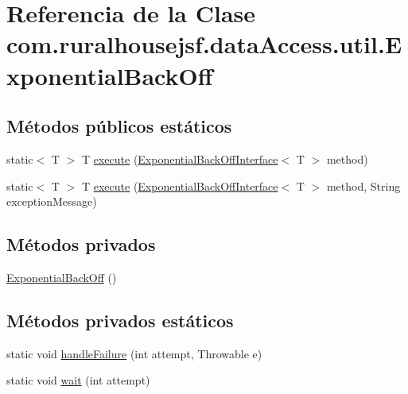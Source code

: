 \hypertarget{classcom_1_1ruralhousejsf_1_1data_access_1_1util_1_1_exponential_back_off}{}\section{Referencia de la Clase com.\+ruralhousejsf.\+data\+Access.\+util.\+Exponential\+Back\+Off}
\label{classcom_1_1ruralhousejsf_1_1data_access_1_1util_1_1_exponential_back_off}
\subsection*{Métodos públicos estáticos}
\begin{DoxyCompactItemize}
\item 
static$<$ T $>$ T \mbox{\hyperlink{classcom_1_1ruralhousejsf_1_1data_access_1_1util_1_1_exponential_back_off_a7c14ce7a46732baa58e3b0bf06455a9b}{execute}} (\mbox{\hyperlink{interfacecom_1_1ruralhousejsf_1_1data_access_1_1util_1_1_exponential_back_off_interface}{Exponential\+Back\+Off\+Interface}}$<$ T $>$ method)
\item 
static$<$ T $>$ T \mbox{\hyperlink{classcom_1_1ruralhousejsf_1_1data_access_1_1util_1_1_exponential_back_off_a67faf7d5bf9a822979a6531ffc86a60d}{execute}} (\mbox{\hyperlink{interfacecom_1_1ruralhousejsf_1_1data_access_1_1util_1_1_exponential_back_off_interface}{Exponential\+Back\+Off\+Interface}}$<$ T $>$ method, String exception\+Message)
\end{DoxyCompactItemize}
\subsection*{Métodos privados}
\begin{DoxyCompactItemize}
\item 
\mbox{\hyperlink{classcom_1_1ruralhousejsf_1_1data_access_1_1util_1_1_exponential_back_off_ac6546eba6d6286cb32074d4f3471296d}{Exponential\+Back\+Off}} ()
\end{DoxyCompactItemize}
\subsection*{Métodos privados estáticos}
\begin{DoxyCompactItemize}
\item 
static void \mbox{\hyperlink{classcom_1_1ruralhousejsf_1_1data_access_1_1util_1_1_exponential_back_off_ae0ed24935adcb80c3687465eaf10f3ed}{handle\+Failure}} (int attempt, Throwable e)
\item 
static void \mbox{\hyperlink{classcom_1_1ruralhousejsf_1_1data_access_1_1util_1_1_exponential_back_off_afd1c5c5ac98adfcf35e0542079fb5314}{wait}} (int attempt)
\end{DoxyCompactItemize}

